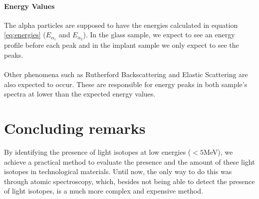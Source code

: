 \documentclass{article}
\begin{document}
\begin{multicols}{2}
\paragraph*{Energy Values} The alpha particles are supposed to have the energies calculated in equation \ref{eq:energies} ($E_{\alpha_1}$ and $E_{\alpha_2}$). 
In the glass sample, we expect to see an energy profile before each peak and in the implant sample we only expect to see the peaks.

\paragraph{}

Other phenomena such as Rutherford Backscattering and Elastic Scattering are also expected to occur. These are responsible for energy peaks in both sample's spectra at lower than the expected energy values.

\section{Concluding remarks}

By identifying the presence of light isotopes at low energies ($<5$MeV), we achieve a practical method to evaluate the presence and the amount of these light isotopes in technological materials.
Until now, the only way to do this was through atomic spectroscopy, which, besides not being able to detect the presence of light isotopes, is a much more complex and expensive method.

\printbibliography
\nocite{*}

\end{multicols}
\end{document}
